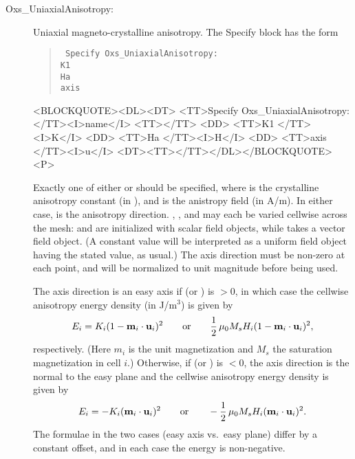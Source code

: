 \begin{description}
\item[Oxs\_UniaxialAnisotropy:]
%
Uniaxial magneto-crystalline anisotropy.  The Specify block has the form
   \begin{latexonly}
      \begin{quote}\tt
      Specify Oxs\_UniaxialAnisotropy: \ocb\\
        \bi K1  \\
        \bi Ha  \\
        \bi axis  \\
      \ccb
      \end{quote}
   \end{latexonly}
   \begin{rawhtml}
   <BLOCKQUOTE><DL><DT>
   <TT>Specify Oxs_UniaxialAnisotropy:</TT><I>name</I> <TT>{</TT>
       <DD> <TT>K1 </TT><I>K</I>
       <DD> <TT>Ha </TT><I>H</I>
       <DD> <TT>axis </TT><I>u</I>
   <DT><TT>}</TT></DL></BLOCKQUOTE><P>
   \end{rawhtml}
  Exactly one of either  or  should be
  specified, where  is the crystalline anisotropy constant
  (in
  ),
  and  is the anistropy field (in A/m).  In either case,
   is the anisotropy direction.  ,
  , and  may each be varied cellwise across
  the mesh:  and  are initialized with scalar
  field objects, while  takes a vector field object.  (A
  constant value will be interpreted as a uniform field object having
  the stated value, as usual.)  The axis direction must be non-zero at
  each point, and will be normalized to unit magnitude before being
  used.

  The axis direction is an easy axis if  (or )
  is $>$0, in which case the cellwise anisotropy energy density (in
  J/m${}^3$) is given by
   \begin{displaymath}
         E_i = K_i(1 - \textbf{m}_i\cdot\textbf{u}_i)^2 \qquad \mbox{or} \qquad
               \frac{1}{2}\, \mu_0 M_s H_i (1 - \textbf{m}_i\cdot\textbf{u}_i)^2,
   \end{displaymath}
  respectively.  (Here $m_i$ is the unit magnetization and $M_s$ the
  saturation magnetization in cell $i$.)  Otherwise, if 
  (or ) is $<0$, the axis direction is the normal to the
  easy plane and the cellwise anisotropy energy density is given by
   \begin{displaymath}
         E_i = -K_i(\textbf{m}_i\cdot\textbf{u}_i)^2 \qquad \mbox{or} \qquad
               -\frac{1}{2}\, \mu_0 M_s H_i (\textbf{m}_i\cdot\textbf{u}_i)^2.
   \end{displaymath}
  The formulae in the two cases (easy axis vs.\ easy plane) differ by a
  constant offset, and in each case the energy is non-negative.


\end{description}
